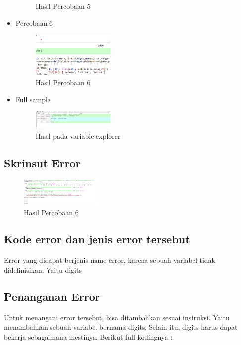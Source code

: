 \begin{itemize}
\begin{figure}[H]
		\centering
		\caption{Hasil Percobaan 5}
	\end{figure}
	\item Percobaan 6  \hfill \break 
	\begin{figure}[H]
		\includegraphics[width=4cm]{figures/1174035/chapter1/5_6_hasil.png}
		\centering
		\caption{Hasil Percobaan 6}
	\end{figure}
	\item Full sample \hfill \break 
	\begin{figure}[H]
		\includegraphics[width=4cm]{figures/1174035/chapter1/5_var.png}
		\centering
		\caption{Hasil pada variable explorer}
	\end{figure}
\end{itemize}
\subsection{Skrinsut Error}
\begin{figure}[H]
	\includegraphics[width=4cm]{figures/1174035/chapter1/skrinsuterror.png}
	\centering
	\caption{Hasil Percobaan 6}
\end{figure}
\subsection{Kode error dan jenis error tersebut}
Error yang didapat berjenis name error, karena sebuah variabel tidak didefinisikan. Yaitu digits

\subsection{Penanganan Error}
Untuk menangani error tersebut, bisa ditambahkan sesuai instruksi. Yaitu menambahkan sebuah variabel bernama digits. Selain itu, digits harus dapat bekerja sebagaimana mestinya. Berikut full kodingnya : 

